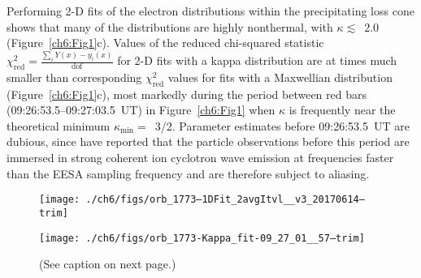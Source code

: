   Performing 2-D fits of the electron distributions within the precipitating
  loss cone shows that many of the distributions are highly nonthermal, with
  $\kappa \lesssim$~2.0 (Figure~\ref{ch6:Fig1}c). Values of the reduced
  chi-squared statistic
  $\chi^2_{\mathrm{red}} = \frac{\sum_i Y(x) - y_i(x)}{\mathrm{dof}}$ for 2-D
  fits with a kappa distribution are at times much smaller than corresponding
  $\chi^2_{\textrm{red}}$ values for fits with a Maxwellian distribution
  (Figure~\ref{ch6:Fig1}c), most markedly during the period between red bars
  (09:26:53.5--09:27:03.5~UT) in Figure~\ref{ch6:Fig1} when $\kappa$ is frequently
  near the theoretical minimum $\kappa_{\mathrm{min}} =$~3/2. Parameter
  estimates before 09:26:53.5~UT are dubious, since \citet{Chaston2002b} have
  reported that the particle observations before this period are immersed in
  strong coherent ion cyclotron wave emission at frequencies faster than the
  EESA sampling frequency and are therefore subject to aliasing.


  \begin{figure}
    \centering

    \noindent\texttt{[image: ./ch6/figs/orb\_1773--1DFit\_2avgItvl\_\_v3\_20170614--trim]}

    \vspace{1cm}

    \noindent\texttt{[image: ./ch6/figs/orb\_1773-Kappa\_fit-09\_27\_01\_\_57--trim]}

    \caption[Example one- and two-dimensional fits of observed inverted-V
    electron distributions (Orbit 1773)]{(See caption on next page.)}
    \label{ch6:Fig2}
  \end{figure}

